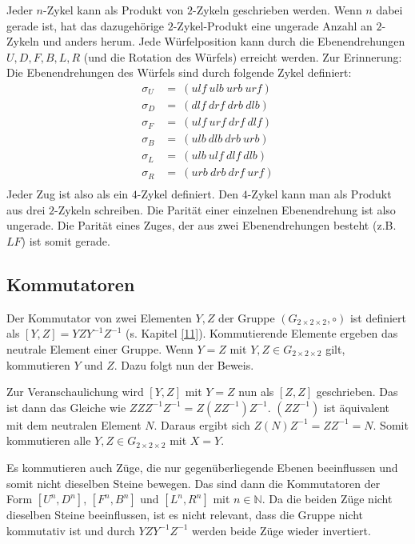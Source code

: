 \documentclass[12pt,a4paper, usenames, dvipsnames]{article}
\theoremstyle{mystyle}
\theoremstyle{definition}
\newcommand{\Gtwo}{\ensuremath{G_{2\times 2\times 2}}}
\begin{document}
Jeder $n$-Zykel kann als Produkt von $2$-Zykeln geschrieben werden. Wenn $n$ dabei gerade ist, hat das dazugehörige $2$-Zykel-Produkt eine ungerade Anzahl an $2$-Zykeln und anders herum. \cite{TD}
Jede Würfelposition kann durch die Ebenendrehungen $U, D, F, B, L, R$ (und die Rotation des Würfels) erreicht werden. 
Zur Erinnerung: Die Ebenendrehungen des Würfels sind durch folgende Zykel definiert:
\begin{align*}
\sigma_U & =\ (ulf \ ulb \ urb \ urf) \\
\sigma_D & =\ (dlf \ drf \ drb \ dlb) \\
\sigma_F & =\ (ulf \ urf \ drf \ dlf) \\
\sigma_B & =\ (ulb \ dlb \ drb \ urb) \\
\sigma_L & =\ (ulb \ ulf \ dlf \ dlb) \\
\sigma_R & =\ (urb \ drb \ drf \ urf) \\
\end{align*}
Jeder Zug ist also als ein $4$-Zykel definiert. Den $4$-Zykel kann man als Produkt aus drei $2$-Zykeln schreiben. 
Die Parität einer einzelnen Ebenendrehung ist also ungerade. Die Parität eines Zuges, der aus zwei Ebenendrehungen besteht (z.B. $LF$) ist somit gerade.


%
%
%
%
%
%
%
%
%
%
%
%
%
%
%
%
%
%
%
%
\subsection*{Kommutatoren}

Der Kommutator von zwei Elementen $Y, Z$ der Gruppe $(\Gtwo, \circ)$ ist definiert als $[Y,Z]=YZY^{-1}Z^{-1}$ (s. Kapitel \ref{11}).
Kommutierende Elemente ergeben das neutrale Element einer Gruppe. 
Wenn $Y = Z$ mit $Y, Z \in \Gtwo$ gilt, kommutieren $Y$ und $Z$. 
Dazu folgt nun der Beweis. 

Zur Veranschaulichung wird $[Y,Z]$ mit $Y=Z$ nun als $[Z,Z]$ geschrieben. Das ist dann das Gleiche wie $ZZZ^{-1}Z^{-1} = Z(ZZ^{-1})Z^{-1}$. 
$(ZZ^{-1})$ ist äquivalent mit dem neutralen Element $N$. Daraus ergibt sich $Z(N)Z^{-1} = ZZ^{-1} = N$. 
Somit kommutieren alle $Y, Z \in \Gtwo$ mit $X=Y$.


Es kommutieren auch Züge, die nur gegenüberliegende Ebenen beeinflussen und somit nicht dieselben Steine bewegen. 
Das sind dann die Kommutatoren der Form $[U^n, D^n]$, $[F^n, B^n]$ und $[L^n, R^n]$ mit $n \in \mathbb{N}$. 
Da die beiden Züge nicht dieselben Steine beeinflussen, ist es nicht relevant, dass die Gruppe nicht kommutativ ist und durch $YZY^{-1}Z^{-1}$ werden beide Züge wieder invertiert. 
\end{document}
